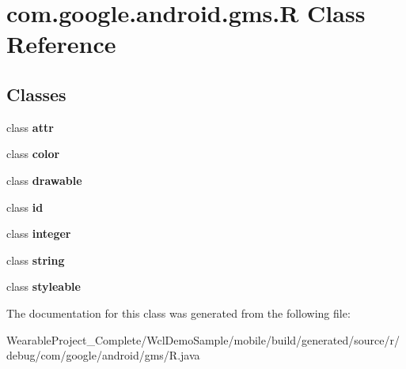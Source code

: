\hypertarget{classcom_1_1google_1_1android_1_1gms_1_1R}{}\section{com.\+google.\+android.\+gms.\+R Class Reference}
\label{classcom_1_1google_1_1android_1_1gms_1_1R}
\subsection*{Classes}
\begin{DoxyCompactItemize}
\item 
class {\bfseries attr}
\item 
class {\bfseries color}
\item 
class {\bfseries drawable}
\item 
class {\bfseries id}
\item 
class {\bfseries integer}
\item 
class {\bfseries string}
\item 
class {\bfseries styleable}
\end{DoxyCompactItemize}


The documentation for this class was generated from the following file\+:\begin{DoxyCompactItemize}
\item 
Wearable\+Project\+\_\+\+Complete/\+Wcl\+Demo\+Sample/mobile/build/generated/source/r/debug/com/google/android/gms/R.\+java\end{DoxyCompactItemize}
